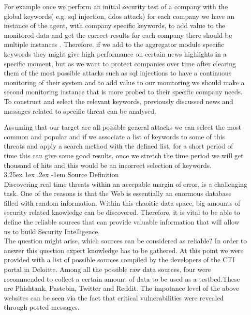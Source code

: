\documentclass[12pt]{article}
\makeatletter
\renewcommand\paragraph{\@startsection{paragraph}{5}{\z@}%
  {3.25ex \@plus1ex \@minus.2ex}%
  {-1em}%
  {\normalfont\normalsize\bfseries}}
\makeatother
\begin{document}
For example once we perform an initial security test of a company with the global keywords( e.g. sql injection, ddos attack) for each company we have an instance of the agent, with company specific keywords, to add value to the monitored data and get the correct results for each company there should be multiple instances . Therefore, if we add to the aggregator module specific keywords they might give high performance on certain news highlights in a specific moment, but as we want to protect companies over time after clearing them of the most possible attacks such as sql injections to have a continuous monitoring of their system and to add value to our monitoring we should make a second monitoring instance that is more probed to their specific company needs. To construct and select the relevant keywords, previously discussed news \cite{list-2015-attacks} and messages related to specific threat can be analysed. 

Assuming that our target are all possible general attacks we can select the most common and popular \cite{owasp} and if we associate a list of keywords to some of this threats and apply a search method with the defined list, for a short period of time this can give some good results, once we stretch the time period we will get thousand of hits and this would be an incorrect selection of keywords.\\

\paragraph{Source Definition}
\hfill \break \\
Discovering real time threats within an accepable margin of error, is a challenging task. One of the reasons is that the Web is essentially an enormous database filled with random information. Within this chaoitic data space, big amounts of security related knowledge can be discovered. Therefore, it is vital to be able to define the reliable sources that can provide valuable information that will allow us to build Security Intelligence. 
\hfill \break \\
The question might arise, which sources can be considered as reliable? In order to answer this question expert knowledge has to be gathered. At this point we were provided with a list of possible sources compiled by the developers of the CTI portal in Deloitte. Among all the possible raw data sources, four were recommended to collect a certain amount of data to be used as a testbed.These are Phishtank, Pastebin, Twitter and Reddit. The impotance level of the above websites can be seen via the fact that critical vulnerabilities were revealed through posted messages\cite{list-2015-attacks}.\\
\end{document}
